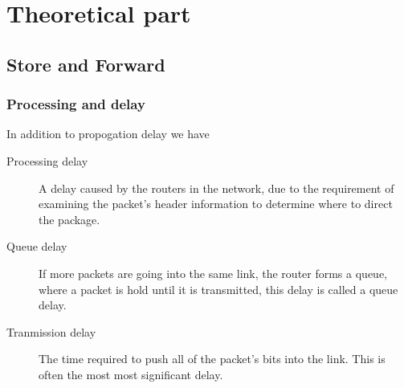 \documentclass[a4paper]{article}
\begin{document}
\maketitle
\thispagestyle{first}
\newpage

\section{Theoretical part}
\subsection{Store and Forward}
\subsubsection{Processing and delay}
In addition to propogation delay we have

\begin{description}
    \item[Processing delay] A delay caused by the routers in the network,
        due to the requirement of examining the packet's header information to
        determine where to direct the package. 
    \item[Queue delay] If more packets are going into the same link, the
        router forms a queue, where a packet is hold until it is
        transmitted, this delay is called a queue delay.
    \item[Tranmission delay] The time required to push all of the packet's bits
        into the link. This is often the most most significant delay.
\end{description}
\end{document}

